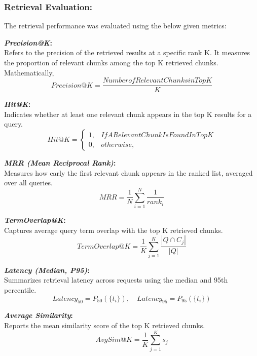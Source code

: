 ﻿\documentclass{article}
\renewcommand{\text}[1]{\mathit{#1}}
\begin{document}
\subsubsection*{Retrieval Evaluation:}
The retrieval performance was evaluated using the below given metrics:

\textbf{\textit{Precision@K}:}\\
Refers to the precision of the retrieved results at a specific rank K. It measures the proportion of relevant chunks among the top K retrieved chunks. Mathematically,
\begin{equation}
\text{Precision@K} = \frac{\text{Number of Relevant Chunks in Top K}}{K}
\end{equation}

\textbf{\textit{Hit@K}:}\\
Indicates whether at least one relevant chunk appears in the top K results for a query.
\begin{equation}
\text{Hit@K} = 
\begin{cases}
1, & \text{If A Relevant Chunk Is Found In Top K} \\
0, & \text{otherwise,}
\end{cases}
\end{equation}

\textbf{\textit{MRR (Mean Reciprocal Rank)}:}\\
Measures how early the first relevant chunk appears in the ranked list, averaged over all queries.
\begin{equation}
\text{MRR} = \frac{1}{N} \sum_{i=1}^{N} \frac{1}{\text{rank}_i}
\end{equation}

\textbf{\textit{TermOverlap@K}:}\\
Captures average query term overlap with the top K retrieved chunks.
\begin{equation}
\text{TermOverlap@K} = \frac{1}{K} \sum_{j=1}^{K} \frac{|Q \cap C_j|}{|Q|}
\end{equation}

\textbf{\textit{Latency (Median, P95)}:}\\
Summarizes retrieval latency across requests using the median and 95th percentile.
\begin{equation}
\text{Latency}_{50} = P_{50}(\{t_i\}), \quad \text{Latency}_{95} = P_{95}(\{t_i\})
\end{equation}

\textbf{\textit{Average Similarity}:}\\
Reports the mean similarity score of the top K retrieved chunks.
\begin{equation}
\text{AvgSim@K} = \frac{1}{K} \sum_{j=1}^{K} s_j
\end{equation}
\end{document}
